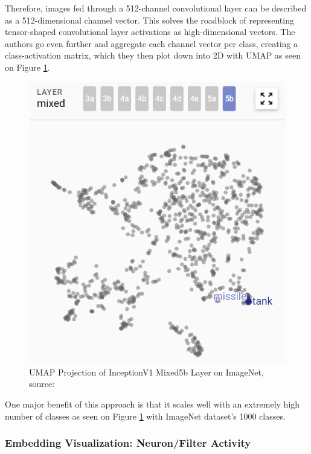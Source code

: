 Therefore, images fed through a 512-channel convolutional layer can be described as a 512-dimensional channel vector. This solves the roadblock of representing tensor-shaped convolutional layer activations as high-dimensional vectors. The authors go even further and aggregate each channel vector per class, creating a class-activation matrix, which they then plot down into 2D with UMAP as seen on Figure \ref{fig:HRV_008_Summit}.

\vspace{0.2cm}

\begin{figure}[H]
	\centering
	\includegraphics[scale=0.85]{images/embedding_view/HRV_Fig_008_hohman_UMAP.PNG}
	\caption{UMAP Projection of InceptionV1 Mixed5b Layer on ImageNet, source: \cite{hohman2020summit}}
	\label{fig:HRV_008_Summit}
\end{figure}

\vspace{0.2cm}

One major benefit of this approach is that it scales well with an extremely high number of classes as seen on Figure \ref{fig:HRV_008_Summit} with ImageNet dataset's 1000 classes.

\subsubsection{Embedding Visualization: Neuron/Filter Activity}

